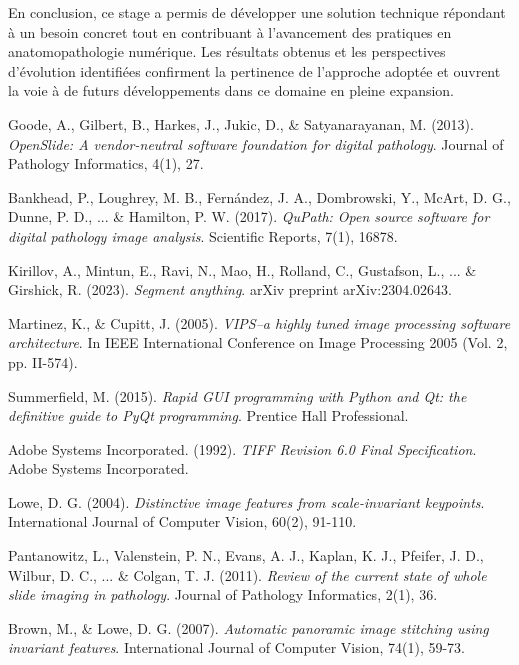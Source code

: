 \documentclass[12pt,a4paper]{report}
\begin{document}
En conclusion, ce stage a permis de développer une solution technique répondant à un besoin concret tout en contribuant à l'avancement des pratiques en anatomopathologie numérique. Les résultats obtenus et les perspectives d'évolution identifiées confirment la pertinence de l'approche adoptée et ouvrent la voie à de futurs développements dans ce domaine en pleine expansion.

\begin{thebibliography}{20}

Goode, A., Gilbert, B., Harkes, J., Jukic, D., \& Satyanarayanan, M. (2013). 
\textit{OpenSlide: A vendor-neutral software foundation for digital pathology}. 
Journal of Pathology Informatics, 4(1), 27.

Bankhead, P., Loughrey, M. B., Fernández, J. A., Dombrowski, Y., McArt, D. G., Dunne, P. D., ... \& Hamilton, P. W. (2017). 
\textit{QuPath: Open source software for digital pathology image analysis}. 
Scientific Reports, 7(1), 16878.

Kirillov, A., Mintun, E., Ravi, N., Mao, H., Rolland, C., Gustafson, L., ... \& Girshick, R. (2023). 
\textit{Segment anything}. 
arXiv preprint arXiv:2304.02643.

Martinez, K., \& Cupitt, J. (2005). 
\textit{VIPS–a highly tuned image processing software architecture}. 
In IEEE International Conference on Image Processing 2005 (Vol. 2, pp. II-574).

Summerfield, M. (2015). 
\textit{Rapid GUI programming with Python and Qt: the definitive guide to PyQt programming}. 
Prentice Hall Professional.

Adobe Systems Incorporated. (1992). 
\textit{TIFF Revision 6.0 Final Specification}. 
Adobe Systems Incorporated.

Lowe, D. G. (2004). 
\textit{Distinctive image features from scale-invariant keypoints}. 
International Journal of Computer Vision, 60(2), 91-110.

Pantanowitz, L., Valenstein, P. N., Evans, A. J., Kaplan, K. J., Pfeifer, J. D., Wilbur, D. C., ... \& Colgan, T. J. (2011). 
\textit{Review of the current state of whole slide imaging in pathology}. 
Journal of Pathology Informatics, 2(1), 36.

Brown, M., \& Lowe, D. G. (2007). 
\textit{Automatic panoramic image stitching using invariant features}. 
International Journal of Computer Vision, 74(1), 59-73.


\end{thebibliography}
\end{document}
